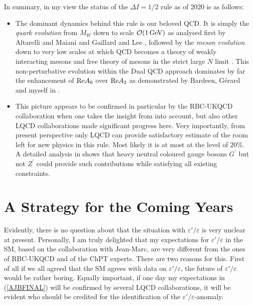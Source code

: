 \documentclass[12pt,a4paper]{article}
\newcommand{\ord}{\mathcal{O}}
\newcommand{\RE}{{\rm Re}}
\newcommand{\gev}{\, {\rm GeV}}
\def\epe{\varepsilon'/\varepsilon}
\begin{document}
  In summary, in my view the status of the $\Delta I=1/2$ rule as of 2020 is as follows:
  \begin{itemize}
  \item
    The dominant dynamics behind this rule is our beloved QCD. It is simply the
    {\em quark evolution} from $M_W$ down to scale $\ord(1\gev)$ as analysed first
    by  Altarelli and Maiani \cite{Altarelli:1974exa} and Gaillard and Lee \cite{Gaillard:1974nj}, followed by the  {\em meson evolution} down to very low scales at which  QCD becomes  a theory of weakly interacting mesons and free theory of mesons in the strict large $N$ limit \cite{'tHooft:1973jz,'tHooft:1974hx,Witten:1979kh,Treiman:1986ep}.
This non-perturbative evolution 
    within  the Dual QCD approach dominates by far the enhancement of
    ${\RE A_0}$ over ${\RE A_2}$ as demonstrated by Bardeen, G{\'e}rard and myself in  \cite{Bardeen:1986vz,Buras:2014maa}.
    \item
      This picture appears to be confirmed in particular by the RBC-UKQCD
      collaboration \cite{Boyle:2012ys,Abbott:2020hxn} when one takes
      the insight from \cite{Buras:2018lgu} into account,
       but also other LQCD collaborations \cite{Donini:2020qfu,Ishizuka:2018qbn} made significant progress  here. Very importantly, from present perspective only LQCD can provide satisfactory
      estimate of the room left for new physics in this rule. Most
      likely it is at most at the level of $20\%$. A detailed analysis in
      \cite{Buras:2014sba} shows that heavy neutral coloured gauge bosons $G^\prime$
      but not $Z^\prime$ could provide such contributions while satisfying all existing constraints.
            \end{itemize}
    
\boldmath
\section{A Strategy for the Coming Years}
\unboldmath
Evidently, there is no question about that the situation with $\epe$ is very unclear at present. Personally, I am truly delighted that my expectations for $\epe$ in the SM, based
on the collaboration with Jean-Marc, are very different from the ones of RBC-UKQCD and of the ChPT experts. There are two reasons for this. First of all if
we all agreed that the SM agrees with data on $\epe$, the future of $\epe$ would be rather boring. Equally important, if one day my expectations in (\ref{AJBFINAL}) will be confirmed by several LQCD collaborations, it will be evident
who should be credited for the identification of the $\epe$-anomaly.
\end{document}
